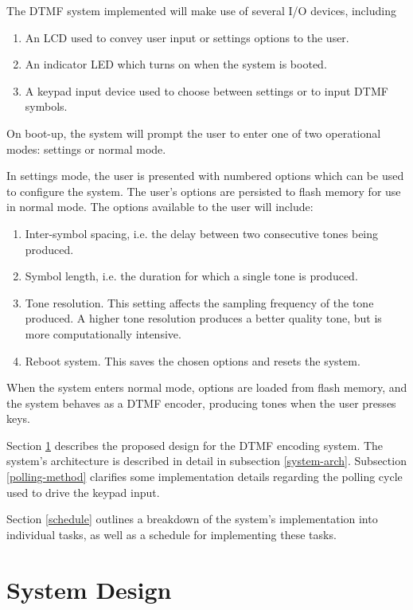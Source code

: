 \documentclass[11pt,a4paper,twocolumn]{scrartcl}
\begin{document}
   The DTMF system implemented will make use of several I/O devices, including
   \begin{enumerate}
      \item An LCD used to convey user input or settings options to the user.
      \item An indicator LED which turns on when the system is booted.
      \item A keypad input device used to choose between settings or to input DTMF symbols.
   \end{enumerate}

   On boot-up, the system will prompt the user to enter one of two operational modes: settings or normal mode.

   In settings mode, the user is presented with numbered options which can be used to configure the system. 
   The user's options are persisted to flash memory for use in normal mode.
   The options available to the user will include:

   \begin{enumerate}
      \item Inter-symbol spacing, i.e. the delay between two consecutive tones being produced.
      \item Symbol length, i.e. the duration for which a single tone is produced.
      \item Tone resolution. This setting affects the sampling frequency of the tone produced. A higher tone resolution produces a better quality tone, but is more computationally intensive.
      \item Reboot system. This saves the chosen options and resets the system.
   \end{enumerate}

   When the system enters normal mode, options are loaded from flash memory, and the system behaves as a DTMF encoder, 
   producing tones when the user presses keys.

   Section \ref{system-design} describes the proposed design for the DTMF encoding system. The system's architecture is described in detail in subsection \ref{system-arch}. 
   Subsection \ref{polling-method} clarifies some implementation details regarding the polling cycle used to drive the keypad input.

   Section \ref{schedule} outlines a breakdown of the system's implementation into individual tasks, as well as a schedule for implementing these tasks.

\section{System Design} \label{system-design}
\end{document}
